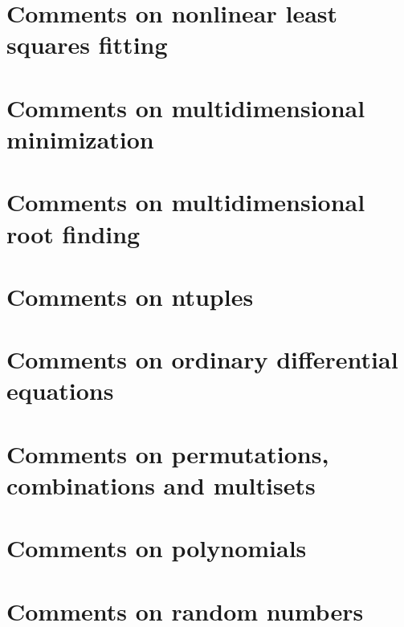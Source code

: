 \documentclass{book}
\begin{document}
\chapter{Comments on nonlinear least squares fitting}
\label{Comments on nonlinear least squares fitting}
\hypertarget{Comments on nonlinear least squares fitting}{}

\chapter{Comments on multidimensional minimization}
\label{Comments on multidimensional minimization}
\hypertarget{Comments on multidimensional minimization}{}

\chapter{Comments on multidimensional root finding}
\label{Comments on multidimensional root finding}
\hypertarget{Comments on multidimensional root finding}{}

\chapter{Comments on ntuples}
\label{Comments on ntuples}
\hypertarget{Comments on ntuples}{}

\chapter{Comments on ordinary differential equations}
\label{Comments on ordinary differential equations}
\hypertarget{Comments on ordinary differential equations}{}

\chapter{Comments on permutations, combinations and multisets}
\label{Comments on permutations, combinations and multisets}
\hypertarget{Comments on permutations, combinations and multisets}{}

\chapter{Comments on polynomials}
\label{Comments on polynomials}
\hypertarget{Comments on polynomials}{}

\chapter{Comments on random numbers}
\label{Comments on random numbers}
\hypertarget{Comments on random numbers}{}

\end{document}
